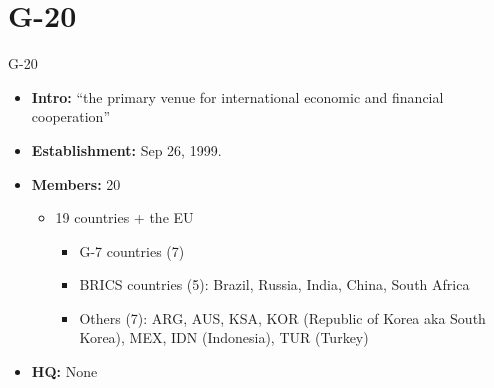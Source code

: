 \documentclass[
  10pt,
  ignorenonframetext,
  progressbar=frametitle]{beamer}
\providecommand{\tightlist}{%
  \setlength{\itemsep}{0pt}\setlength{\parskip}{0pt}}
\begin{document}
\section{G-20}
\begin{frame}[allowframebreaks]
{G-20}
\protect\hypertarget{g-20}{}
\begin{itemize}
\tightlist
\item
  \textbf{Intro:} ``the primary venue for international economic and
  financial cooperation''
\item
  \textbf{Establishment:} Sep 26, 1999.
\item
  \textbf{Members:} 20

  \begin{itemize}
  \tightlist
  \item
    19 countries + the EU

    \begin{itemize}
    \tightlist
    \item
      G-7 countries (7)
    \item
      BRICS countries (5): Brazil, Russia, India, China, South Africa
    \item
      Others (7): ARG, AUS, KSA, KOR (Republic of Korea aka South
      Korea), MEX, IDN (Indonesia), TUR (Turkey)
    \end{itemize}
  \end{itemize}
\item
  \textbf{HQ:} None
\end{itemize}
\end{frame}
\end{document}
